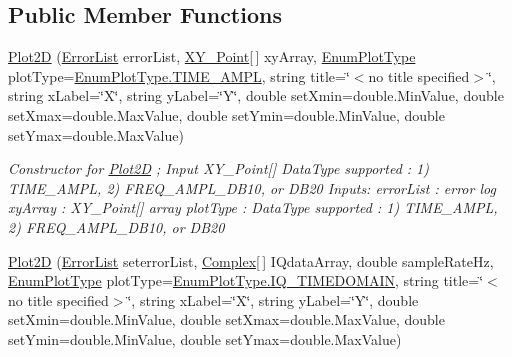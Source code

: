 \subsection*{Public Member Functions}
\begin{DoxyCompactItemize}
\item 
\mbox{\hyperlink{class_c_s_i_1_1_library_1_1_plotting_lib_1_1_plot2_d_a387e59212204675da745d312a9b63c98}{Plot2D}} (\mbox{\hyperlink{class_c_s_i_1_1_library_1_1_errors_1_1_error_list}{Error\+List}} error\+List, \mbox{\hyperlink{struct_c_s_i_1_1_library_1_1_data_types_1_1_x_y___point}{X\+Y\+\_\+\+Point}}\mbox{[}$\,$\mbox{]} xy\+Array, \mbox{\hyperlink{class_c_s_i_1_1_library_1_1_plotting_lib_1_1_plot2_d_ad94829020c4869820a1ecb690d5ea98f}{Enum\+Plot\+Type}} plot\+Type=\mbox{\hyperlink{class_c_s_i_1_1_library_1_1_plotting_lib_1_1_plot2_d_ad94829020c4869820a1ecb690d5ea98fa5fa9cc75a244a268a87e9aa160bab231}{Enum\+Plot\+Type.\+T\+I\+M\+E\+\_\+\+A\+M\+PL}}, string title=\char`\"{}$<$no title specified$>$\char`\"{}, string x\+Label=\char`\"{}X\char`\"{}, string y\+Label=\char`\"{}Y\char`\"{}, double set\+Xmin=double.\+Min\+Value, double set\+Xmax=double.\+Max\+Value, double set\+Ymin=double.\+Min\+Value, double set\+Ymax=double.\+Max\+Value)
\begin{DoxyCompactList}\small\item\em Constructor for \mbox{\hyperlink{class_c_s_i_1_1_library_1_1_plotting_lib_1_1_plot2_d}{Plot2D}} ; Input X\+Y\+\_\+\+Point\mbox{[}\mbox{]} Data\+Type supported \+: 1) T\+I\+M\+E\+\_\+\+A\+M\+PL, 2) F\+R\+E\+Q\+\_\+\+A\+M\+P\+L\+\_\+\+D\+B10, or D\+B20 Inputs\+: error\+List \+: error log xy\+Array \+: X\+Y\+\_\+\+Point\mbox{[}\mbox{]} array plot\+Type \+: Data\+Type supported \+: 1) T\+I\+M\+E\+\_\+\+A\+M\+PL, 2) F\+R\+E\+Q\+\_\+\+A\+M\+P\+L\+\_\+\+D\+B10, or D\+B20 \end{DoxyCompactList}\item 
\mbox{\hyperlink{class_c_s_i_1_1_library_1_1_plotting_lib_1_1_plot2_d_a94d11a9efa6900ccea84bf4b56a1b0b7}{Plot2D}} (\mbox{\hyperlink{class_c_s_i_1_1_library_1_1_errors_1_1_error_list}{Error\+List}} seterror\+List, \mbox{\hyperlink{struct_c_s_i_1_1_library_1_1_data_types_1_1_complex}{Complex}}\mbox{[}$\,$\mbox{]} I\+Qdata\+Array, double sample\+Rate\+Hz, \mbox{\hyperlink{class_c_s_i_1_1_library_1_1_plotting_lib_1_1_plot2_d_ad94829020c4869820a1ecb690d5ea98f}{Enum\+Plot\+Type}} plot\+Type=\mbox{\hyperlink{class_c_s_i_1_1_library_1_1_plotting_lib_1_1_plot2_d_ad94829020c4869820a1ecb690d5ea98fa50dd97333b9564ef1065d4691a3d0171}{Enum\+Plot\+Type.\+I\+Q\+\_\+\+T\+I\+M\+E\+D\+O\+M\+A\+IN}}, string title=\char`\"{}$<$no title specified$>$\char`\"{}, string x\+Label=\char`\"{}X\char`\"{}, string y\+Label=\char`\"{}Y\char`\"{}, double set\+Xmin=double.\+Min\+Value, double set\+Xmax=double.\+Max\+Value, double set\+Ymin=double.\+Min\+Value, double set\+Ymax=double.\+Max\+Value)

\end{DoxyCompactItemize}
